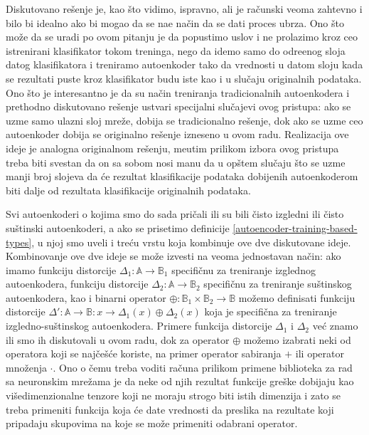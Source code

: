 \documentclass{article}
\begin{document}
	Diskutovano re\v senje je, kao \v sto vidimo, ispravno, ali je ra\v cunski veoma zahtevno i bilo bi idealno ako bi mogao da se na\dj e na\v cin da se dati proces ubrza.
	Ono \v sto mo\v ze da se uradi po ovom pitanju je da popustimo uslov i ne prolazimo kroz ceo istrenirani klasifikator tokom treninga, nego da idemo samo do odre\dj enog sloja datog klasifikatora i treniramo autoenkoder tako da vrednosti u datom sloju kada se rezultati puste kroz klasifikator budu iste kao i u slu\v caju originalnih podataka.
	Ono \v sto je interesantno je da su na\v cin treniranja tradicionalnih autoenkodera i prethodno diskutovano re\v senje ustvari specijalni slu\v cajevi ovog pristupa: ako se uzme samo ulazni sloj mre\v ze, dobija se tradicionalno re\v senje, dok ako se uzme ceo autoenkoder dobija se originalno re\v senje izneseno u ovom radu. 
	Realizacija ove ideje je analogna originalnom re\v senju, me\dj utim prilikom izbora ovog pristupa treba biti svestan da on sa sobom nosi manu da u op\v stem slu\v caju \v sto se uzme manji broj slojeva da \'ce rezultat klasifikacije podataka dobijenih autoenkoderom biti dalje od rezultata klasifikacije originalnih podataka.
	
	Svi autoenkoderi o kojima smo do sada pri\v cali ili su bili \v cisto izgledni ili \v cisto su\v stinski autoenkoderi, a ako se prisetimo definicije \ref{autoencoder-training-based-types}, u njoj smo uveli i tre\'cu vrstu koja kombinuje ove dve diskutovane ideje. 
	Kombinovanje ove dve ideje se mo\v ze izvesti na veoma jednostavan na\v cin: ako imamo funkciju distorcije $\Delta_1 : \mathbb{A} \to \mathbb{B}_1$ specifi\v cnu za treniranje izglednog autoenkodera, funkciju distorcije $\Delta_2 : \mathbb{A} \to \mathbb{B}_2$ specifi\v cnu za treniranje su\v stinskog autoenkodera, kao i binarni operator $\oplus : \mathbb{B}_1 \times \mathbb{B}_2 \to \mathbb{B}$ mo\v zemo definisati funkciju distorcije $\Delta' : \mathbb{A} \to \mathbb{B} : x \to \Delta_1 (x) \oplus \Delta_2 (x)$ koja je specifi\v cna za treniranje izgledno-su\v stinskog autoenkodera.
	Primere funkcija distorcije $\Delta_1$ i $\Delta_2$ ve\'c znamo ili smo ih diskutovali u ovom radu, dok za operator $\oplus$ mo\v zemo izabrati neki od operatora koji se naj\v ce\v s\'ce koriste, na primer operator sabiranja $+$ ili operator mno\v zenja $\cdot$.
	Ono o \v cemu treba voditi ra\v cuna prilikom primene biblioteka za rad sa neuronskim mre\v zama je da neke od njih rezultat funkcije gre\v ske dobijaju kao vi\v sedimenzionalne tenzore koji ne moraju strogo biti istih dimenzija i zato se treba primeniti funkcija koja \'ce date vrednosti da preslika na rezultate koji pripadaju skupovima na koje se mo\v ze primeniti odabrani operator.
	
\end{document}
